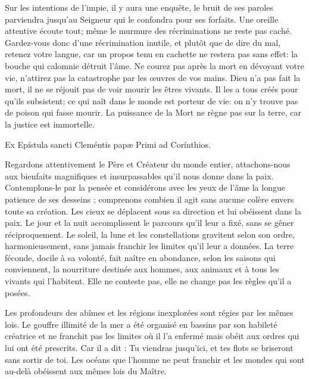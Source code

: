 \documentclass[RG2023_CarnetSpecial.tex]{subfiles}
\begin{document}
Sur les intentions de l’impie, il y aura une enquête,
	le bruit de ses paroles parviendra jusqu’au Seigneur
		qui le confondra pour ses forfaits.
Une oreille attentive écoute tout;
	même le murmure des récriminations ne reste pas caché.
Gardez-vous donc d’une récrimination inutile,
	et plutôt que de dire du mal, retenez votre langue,
	car un propos tenu en cachette ne restera pas sans effet:
	la bouche qui calomnie détruit l’âme.
Ne courez pas après la mort en dévoyant votre vie, 
	n’attirez pas la catastrophe par les œuvres de vos mains.
Dieu n’a pas fait la mort, 
	il ne se réjouit pas de voir mourir les êtres vivants.
Il les a tous créés pour qu’ils subsistent; 
	ce qui naît dans le monde est porteur de vie: 
	on n’y trouve pas de poison qui fasse mourir.
La puissance de la Mort ne règne pas sur la terre,
	car la justice est immortelle.


Ex Epístula sancti Cleméntis papæ Primi ad Corínthios.

Regardons attentivement le Père et Créateur du monde entier, 
	attachons-nous aux bienfaits magnifiques et insurpassables qu'il nous donne dans la paix.
Contemplons-le par la pensée
	et considérons avec les yeux de l'âme la longue patience de ses desseins ;
	comprenons combien il agit sans aucune colère envers toute sa création.
Les cieux se déplacent sous sa direction et lui obéissent dans la paix.
Le jour et la nuit accomplissent le parcours qu'il leur a fixé, sans se gêner réciproquement.
Le soleil, la lune et les constellations gravitent selon son ordre, harmonieusement,
	sans jamais franchir les limites qu'il leur a données.
La terre féconde, docile à sa volonté,
	fait naître en abondance, selon les saisons qui conviennent, la nourriture
		destinée aux hommes, aux animaux et à tous les vivants qui l'habitent.
Elle ne conteste pas, elle ne change pas les règles qu'il a posées.


Les profondeurs des abîmes et les régions inexplorées sont régies par les mêmes lois.
Le gouffre illimité de la mer a été organisé en bassins par son habileté créatrice
	et ne franchit pas les limites où il l'a enfermé
	mais obéit aux ordres qui lui ont été prescrits.
Car il a dit : Tu viendras jusqu'ici, et tes flots se briseront sans sortir de toi.
Les océans que l'homme ne peut franchir et les mondes qui sont au-delà
	obéissent aux mêmes lois du Maître.
\end{document}
